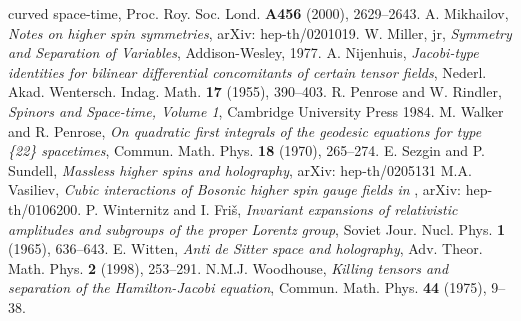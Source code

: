 \documentclass[a4paper,12pt]{amsart}
\begin{document}
\begin{thebibliography}{XX}
{curved space-time},
Proc. Roy. Soc. Lond. {\bf A456} (2000), 2629--2643.
 A. Mikhailov,
{\em Notes on higher spin symmetries},
arXiv: hep-th/0201019.
 W. Miller, jr,
{\em Symmetry and Separation of Variables},
Addison-Wesley, 1977.
 A. Nijenhuis,
{\em Jacobi-type identities for bilinear differential concomitants of certain
tensor fields},
Nederl. Akad. Wentersch. Indag. Math. {\bf 17} (1955), 390--403.
 R. Penrose and W. Rindler,
{\em Spinors and Space-time, Volume 1},
Cambridge University Press 1984.
 M. Walker and R. Penrose,
{\em On quadratic first integrals of the geodesic\linebreak
equations for type \{22\} spacetimes},
Commun. Math. Phys. {\bf 18} (1970), 265--274.
 E. Sezgin and P. Sundell,
{\em Massless higher spins and holography},
arXiv: hep-th/0205131
 M.A. Vasiliev,
{\em Cubic interactions of Bosonic higher spin gauge fields in \coordHE{}},
arXiv: hep-th/0106200.
 P. Winternitz and I. Fri\v{s},
{\em Invariant expansions of relativistic amplitudes and subgroups of the
proper Lorentz group}, Soviet Jour. Nucl. Phys. {\bf 1} (1965), 636--643.
 E. Witten,
{\em Anti de Sitter space and holography},
Adv. Theor. Math. Phys. {\bf 2} (1998), 253--291.
 N.M.J. Woodhouse,
{\em Killing tensors and separation of the Hamilton-Jacobi equation},
Commun. Math. Phys. {\bf 44} (1975), 9--38.
\end{thebibliography}
\end{document}
